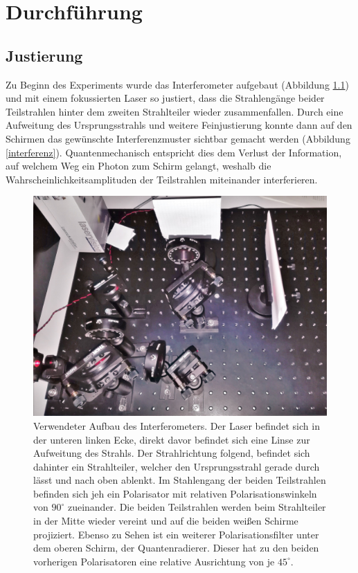 \documentclass{include/thesisclass3}
\begin{document}
\chapter{Durchführung}
\section{Justierung}
Zu Beginn des Experiments wurde das Interferometer aufgebaut (Abbildung \ref{aufbau}) und mit einem fokussierten Laser so justiert, dass die Strahlengänge beider Teilstrahlen hinter dem zweiten Strahlteiler wieder zusammenfallen. Durch eine Aufweitung des Ursprungsstrahls und weitere Feinjustierung konnte dann auf den Schirmen das gewünschte Interferenzmuster sichtbar gemacht werden (Abbildung \ref{interferenz}). Quantenmechanisch entspricht dies dem Verlust der Information, auf welchem Weg ein Photon zum Schirm gelangt, weshalb die Wahrscheinlichkeitsamplituden der Teilstrahlen miteinander interferieren.
\begin{figure}[H]
\centering
\includegraphics[scale=0.1]{images/eigener-aufbau.jpg}
\caption{Verwendeter Aufbau des Interferometers. Der Laser befindet sich in der unteren linken Ecke, direkt davor befindet sich eine Linse zur Aufweitung des Strahls. Der Strahlrichtung folgend, befindet sich dahinter ein Strahlteiler, welcher den Ursprungsstrahl gerade durch lässt und nach oben ablenkt. Im Stahlengang der beiden Teilstrahlen befinden sich jeh ein Polarisator mit relativen Polarisationswinkeln von $90^\circ$ zueinander. Die beiden Teilstrahlen werden beim Strahlteiler in der Mitte wieder vereint und auf die beiden weißen Schirme projiziert. Ebenso zu Sehen ist ein weiterer Polarisationsfilter unter dem oberen Schirm, der Quantenradierer. Dieser hat zu den beiden vorherigen Polarisatoren eine relative Ausrichtung von je $45^\circ$.}
\label{aufbau}
\end{figure}
\end{document}
